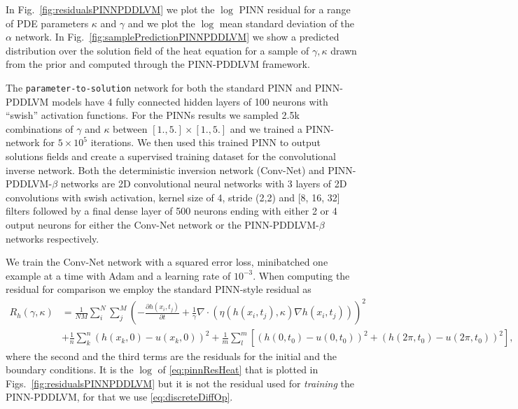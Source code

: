 \documentclass[11pt, fleqn]{article}
\begin{document}
 In Fig.~\ref{fig:residualsPINNPDDLVM} we plot the $\log$ \gls*{PINN} residual for a range of PDE parameters $\kappa$ and $\gamma$ and we plot the $\log$ mean standard deviation of the $\alpha$ network. In Fig.~\ref{fig:samplePredictionPINNPDDLVM} we show a predicted distribution over the solution field of the heat equation for a sample of $\gamma, \kappa$ drawn from the prior and computed through the \gls*{PINN}-\gls*{PDDLVM} framework.

The \texttt{parameter-to-solution} network for both the standard \gls*{PINN} and \gls*{PINN}-\gls*{PDDLVM} models have 4 fully connected hidden layers of 100 neurons with ``swish'' activation functions. For the PINNs results we sampled 2.5k combinations of $\gamma$ and $\kappa$ between $[1., 5.] \times [1., 5.]$ and we trained a PINN-network for $5\times10^5$ iterations. We then used this trained PINN to output solutions fields and create a supervised training dataset for the convolutional inverse network. Both the deterministic inversion network (Conv-Net) and PINN-PDDLVM-$\beta$ networks are 2D convolutional neural networks with 3 layers of 2D convolutions with swish activation, kernel size of 4, stride (2,2) and [8, 16, 32] filters followed by a final dense layer of 500 neurons ending with either 2 or 4 output neurons for either the Conv-Net network or the PINN-PDDLVM-$\beta$ networks respectively. 

We train the Conv-Net network with a squared error loss, minibatched one example at a time with Adam and a learning rate of $10^{-3}$. When computing the residual for comparison we employ the standard \gls*{PINN}-style \cite{raissi2019physics}  residual as 
\begin{align}
    R_h(\gamma, \kappa) &= \frac{1}{NM}\sum_i^N \sum_j^M\left(  -\frac{\partial h(x_i,t_j)}{\partial t} + \frac{1}{\gamma}\nabla\cdot(\eta(h(x_i,t_j), \kappa)\nabla h(x_i,t_j))\right)^2 \nonumber\\&+ \frac{1}{n}\sum_k^n\left(h(x_k, 0) - u(x_k, 0)\right)^2 + \frac{1}{m}\sum_l^m\left[\left(h(0, t_0) - u(0, t_0)\right)^2 + \left(h(2\pi, t_0) - u(2\pi, t_0)\right)^2 \right],
    \label{eq:pinnResHeat}
\end{align} 
where the second and the third terms are the residuals for the initial and the boundary conditions. It is the $\log$ of \eqref{eq:pinnResHeat} that is plotted in Figs.~\ref{fig:residualsPINNPDDLVM} but it is not the residual used for \textit{training} the \gls*{PINN}-\gls*{PDDLVM}, for that we use \eqref{eq:discreteDiffOp}.
\end{document}
